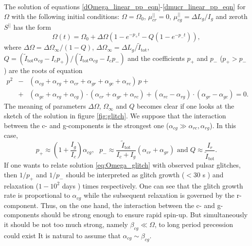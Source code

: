 \documentclass[a4paper]{jpconf}
\begin{document}
    The solution of equations \eqref{dOmega_linear_pp_eqn}-\eqref{dmucr_linear_pp_eqn} for $\Omega$ with the following initial conditions: $\Omega = \Omega_0$, $\mu_{cr}^{||} = 0$, $\mu_{cg}^{||} = \Delta L_g/I_g$ and zeroth ${S}^{||}$ has the form
    \begin{equation}
      \label{eq:Omega_glitch}
      \Omega(t) = \Omega_0 + \Delta\Omega
      \left( 1 - e^{-p_{+}t} - Q (1-e^{-p_{-}t}) \right),
    \end{equation}
    where 
    $\Delta\Omega = {\Delta \Omega_{\infty}}/{(1-Q)}$,
    $\Delta\Omega_{\infty} = { \Delta L_{g}}/{\tilde{I}_\mathrm{tot}}$,
    $Q = (\tilde{I}_\mathrm{tot} \alpha_{cg} - I_{c} p_{+} )/( \tilde{I}_\mathrm{tot} \alpha_{cg} - I_{c} p_{-} )$ and
    the coefficients $p_{+}$ and $p_{-}$ ($p_{+} > p_{-}$)
    are the roots of equation
    \begin{eqnarray}
      p^{2} & - &
      \left( \alpha_{cg} + \alpha_{rg} + \alpha_{cr} + \alpha_{gr} 
           + \alpha_{gc} + \alpha_{rc}
      \right) \, p 
      +
      \nonumber
      \\
       & + &
        \left( \alpha_{gc} + \alpha_{rg} + \alpha_{cg} \right) \cdot
        \left( \alpha_{cr} + \alpha_{gr} + \alpha_{rc} \right)
      + \left( \alpha_{rc} - \alpha_{rg} \right) \cdot
        \left( \alpha_{gr} - \alpha_{gc} \right)
      = 0.
      \label{p_def} 
    \end{eqnarray}
    The meaning of parameters $\Delta\Omega$, $\Omega_\infty$ and $Q$ becomes clear if one looks at the sketch of the solution in figure \ref{fig:glitch}.
    We suppose that the interaction between the c- and  g-components is the strongest one ($\alpha_{cg} \gg  \alpha_{rc}, \alpha_{rg}$). In this case,
    \begin{equation}
      \label{eq:p+p-Q}
      p_{+} \approx \left( 1 + \frac{I_{g}}{I_{c}} \right) \alpha_{cg}, \  \ \ p_{-} \approx \frac{\tilde{I}_\mathrm{tot}}{I_{c} + I_{g}} \left( \alpha_{cr} + \alpha_{gr} \right)
      \mbox{\ \ and \ \ }
      Q \approx \frac{I_{r}}{\tilde{I}_\mathrm{tot}}.
    \end{equation}
    If one wants to relate solution \eqref{eq:Omega_glitch} with observed pulsar glitches, then $1/p_{+}$ and $1/p_{-}$ should be interpreted as glitch growth ($ < 30$ s \cite{DodsonLewisMcCulloch2007}) and relaxation ($1-10^2$ days \cite{LyneShemarSmith2000}) times respectively.       
    One can see that the glitch growth rate is proportional to $\alpha_{cg}$
    while the subsequent relaxation is governed by the r-component. 
    Thus, on the one hand, the interaction between the c-  and g-components should be strong enough to ensure rapid spin-up.
    But simultaneously it should  be not too much strong, namely $\beta_{cg} \ll \Omega$, to long period precession could exist 
    It is natural to assume that $\alpha_{cg} \sim \beta_{cg}$.    
  
\end{document}
